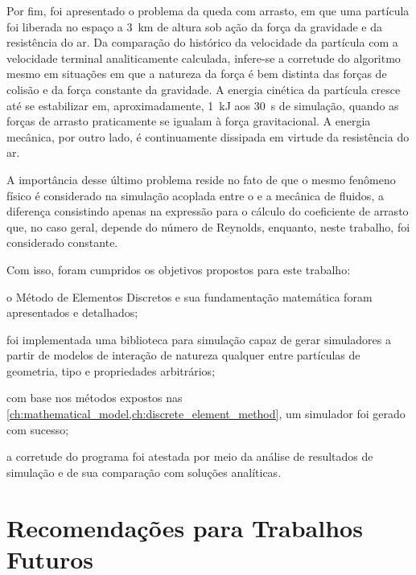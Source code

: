 Por fim, foi apresentado o problema da queda com arrasto, em que uma partícula foi liberada no espaço a \SI{3}{\kilo\meter} de altura sob ação da força da gravidade e da resistência do ar. Da comparação do histórico da velocidade da partícula com a velocidade terminal analiticamente calculada, infere-se a corretude do algoritmo mesmo em situações em que a natureza da força é bem distinta das forças de colisão e da força constante da gravidade. A energia cinética da partícula cresce até se estabilizar em, aproximadamente, \SI{1}{\kilo\joule} aos \SI{30}{\second} de simulação, quando as forças de arrasto praticamente se igualam à força gravitacional. A energia mecânica, por outro lado, é continuamente dissipada em virtude da resistência do ar.

A importância desse último problema reside no fato de que o mesmo fenômeno físico é considerado na simulação acoplada entre o \DEM{} e a mecânica de fluidos, a diferença consistindo apenas na expressão para o cálculo do coeficiente de arrasto que, no caso geral, depende do número de Reynolds, enquanto, neste trabalho, foi considerado constante.

Com isso, foram cumpridos os objetivos propostos para este trabalho:
\begin{alineas}
\item o Método de Elementos Discretos e sua fundamentação matemática foram apresentados e detalhados;
\item foi implementada uma biblioteca para simulação \DEM{} capaz de gerar simuladores a partir de modelos de interação de natureza qualquer entre partículas de geometria, tipo e propriedades arbitrários;
\item com base nos métodos expostos nas \cref{ch:mathematical_model,ch:discrete_element_method}, um simulador foi gerado com sucesso;
\item a corretude do programa foi atestada por meio da análise de resultados de simulação e de sua comparação com soluções analíticas.
\end{alineas}

\section{Recomendações para Trabalhos Futuros}

